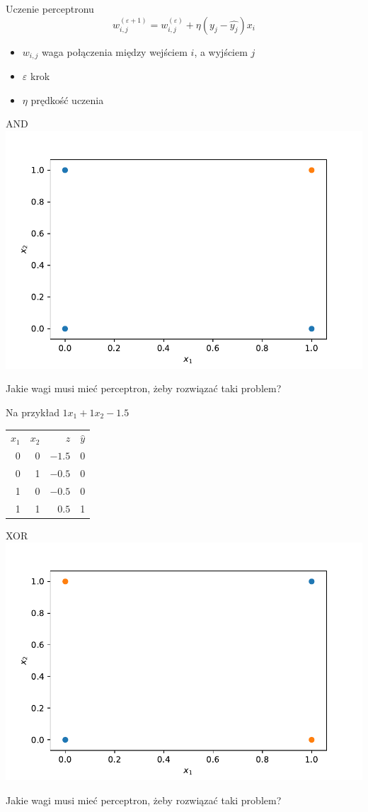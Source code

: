 \documentclass{sa}
\begin{document}
\begin{frame}{Uczenie perceptronu}
\[ w_{i,j}^{(\varepsilon+1)} = w_{i,j}^{(\varepsilon)} + \eta(y_j-\hat{y_j})x_i \]
\begin{itemize}
\item $w_{i,j}$ waga połączenia między wejściem $i$, a wyjściem $j$
\item $\varepsilon$ krok
\item $\eta$ prędkość uczenia
\end{itemize}
\end{frame}


\begin{frame}{AND}
\includegraphics[width=.9\textwidth]{and.pdf}

\alert{Jakie wagi musi mieć perceptron, żeby rozwiązać taki problem?}
{
Na przykład $1x_1+1x_2-1.5$
\begin{tabular}{rrrr}
$x_1$ & $x_2$ & $z$ & $\hat{y}$ \\
0 & 0 & $-1.5$ & 0 \\
0 & 1 & $-0.5$ & 0 \\
1 & 0 & $-0.5$ & 0 \\
1 & 1 & $0.5$ & 1 \\
\end{tabular}
}
\end{frame}

\begin{frame}{XOR}
\includegraphics[width=.9\textwidth]{xor.pdf}

\alert{Jakie wagi musi mieć perceptron, żeby rozwiązać taki problem?}
\end{frame}
\end{document}
